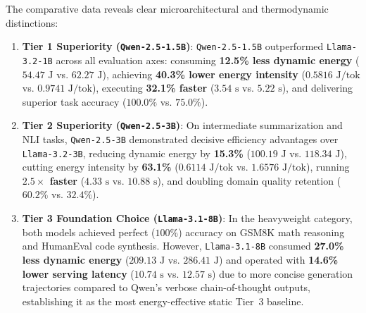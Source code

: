 \documentclass[runningheads]{llncs}
\begin{document}
The comparative data reveals clear microarchitectural and thermodynamic distinctions:
\begin{enumerate}
    \item \textbf{Tier 1 Superiority (\texttt{Qwen-2.5-1.5B})}: \texttt{Qwen-2.5-1.5B} outperformed \texttt{Llama-3.2-1B} across all evaluation axes: consuming \textbf{12.5\% less dynamic energy} ($54.47\text{ J}$ vs. $62.27\text{ J}$), achieving \textbf{40.3\% lower energy intensity} ($0.5816\text{ J/tok}$ vs. $0.9741\text{ J/tok}$), executing \textbf{32.1\% faster} ($3.54\text{ s}$ vs. $5.22\text{ s}$), and delivering superior task accuracy ($100.0\%$ vs. $75.0\%$).
    \item \textbf{Tier 2 Superiority (\texttt{Qwen-2.5-3B})}: On intermediate summarization and NLI tasks, \texttt{Qwen-2.5-3B} demonstrated decisive efficiency advantages over \texttt{Llama-3.2-3B}, reducing dynamic energy by \textbf{15.3\%} ($100.19\text{ J}$ vs. $118.34\text{ J}$), cutting energy intensity by \textbf{63.1\%} ($0.6114\text{ J/tok}$ vs. $1.6576\text{ J/tok}$), running \textbf{$2.5\times$ faster} ($4.33\text{ s}$ vs. $10.88\text{ s}$), and doubling domain quality retention ($60.2\%$ vs. $32.4\%$).
    \item \textbf{Tier 3 Foundation Choice (\texttt{Llama-3.1-8B})}: In the heavyweight category, both models achieved perfect ($100\%$) accuracy on GSM8K math reasoning and HumanEval code synthesis. However, \texttt{Llama-3.1-8B} consumed \textbf{27.0\% less dynamic energy} ($209.13\text{ J}$ vs. $286.41\text{ J}$) and operated with \textbf{14.6\% lower serving latency} ($10.74\text{ s}$ vs. $12.57\text{ s}$) due to more concise generation trajectories compared to Qwen's verbose chain-of-thought outputs, establishing it as the most energy-effective static Tier~3 baseline.
\end{enumerate}

\FloatBarrier
\vspace{1.5em}



\end{document}
